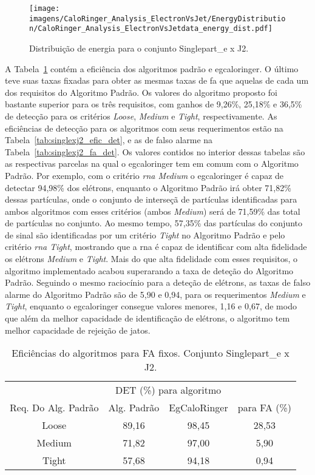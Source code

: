 \begin{figure}[ht]
\centering
\texttt{[image: imagens/CaloRinger\_Analysis\_ElectronVsJet/EnergyDistribution/CaloRinger\_Analysis\_ElectronVsJetdata\_energy\_dist.pdf]}
\label{fig:singlexj2_distenergia}
\caption{Distribuição de energia para o conjunto Singlepart\_e x J2.}
\end{figure}

A Tabela~\ref{tab:singlexj2_efic} contém a eficiência dos algoritmos padrão e
\gls{egcaloringer}. O último teve suas taxas fixadas para obter as mesmas taxas
de \gls{fa} que aquelas de cada um dos requisitos do Algoritmo Padrão. Os
valores do algoritmo proposto foi bastante superior para os três requisitos, com
ganhos de 9,26\%, 25,18\% e 36,5\% de detecção para os critérios \emph{Loose},
\emph{Medium} e \emph{Tight}, respectivamente. As eficiências de
detecção para os algoritmos com seus requerimentos estão na
Tabela~\ref{tab:singlexj2_efic_det}, e as de falso alarme
na Tabela~\ref{tab:singlexj2_fa_det}. Os valores contidos no interior dessas
tabelas são as respectivas parcelas na qual o \gls{egcaloringer} tem em comum
com o Algoritmo Padrão. Por exemplo, com o critério \emph{\gls{rna} Medium} o
\gls{egcaloringer} é capaz de detectar 94,98\% dos elétrons, enquanto o
Algoritmo Padrão irá obter 71,82\% dessas partículas, onde o conjunto de
interseçã de partículas identificadas para ambos algoritmos com esses critérios
(ambos \emph{Medium}) será de 71,59\% das total de partículas no conjunto. Ao
mesmo tempo, 57,35\% das partículas do conjunto de sinal são identificadas por um critério
\emph{Tight} no Algoritmo Padrão e pelo critério \emph{\gls{rna} Tight},
mostrando que a \gls{rna} é capaz de identificar com alta fidelidade os elétrons
\emph{Medium} e \emph{Tight}. Mais do que alta fidelidade com esses requisitos,
o algoritmo implementado acabou superarando a taxa de deteção do Algoritmo
Padrão. Seguindo o mesmo raciocínio para a deteção de elétrons, as taxas de falso
alarme do Algoritmo Padrão são de 5,90 e 0,94, para os requerimentos \emph{Medium}
e \emph{Tight}, enquanto o \gls{egcaloringer} consegue valores menores, 1,16 e
0,67, de modo que além da melhor capacidade de identificação de elétrons, o
algoritmo tem melhor capacidade de rejeição de jatos.

\begin{table}[htb]
\centering
\begin{tabular}{cccc}
\hline
\hline
 & 
\multicolumn{2}{c}{DET (\%) para algoritmo} & 
\\
\cline{2-3}
\multirow{-2}{*}{Req. Do Alg. Padrão} & 
Alg. Padrão & 
EgCaloRinger & 
\multirow{-2}{*}{para FA (\%)} \\
\hline
Loose & 89,16 & 98,45 & 28,53 \\
Medium & 71,82 & 97,00 & 5,90 \\
Tight & 57,68 & 94,18 & 0,94 \\
\hline
\hline
\end{tabular}
\caption{Eficiências do algoritmos para FA fixos. Conjunto Singlepart\_e x J2.}
\label{tab:singlexj2_efic}
\end{table}

